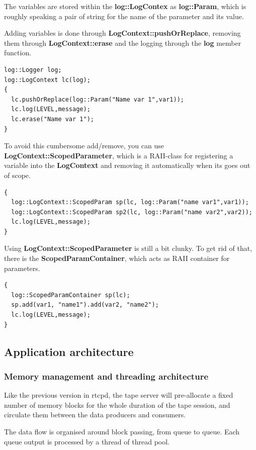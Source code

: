 The variables are stored within the \textbf{log::LogContex} as \textbf{log::Param}, which is roughly speaking a pair of string 
for the name of the parameter and its value.

Adding variables is done through \textbf{LogContext::pushOrReplace}, removing them through \textbf{LogContext::erase} and the 
logging through the \textbf{log} member function.
\begin{table}[h]
\begin{lstlisting}
log::Logger log;
log::LogContext lc(log);
{
  lc.pushOrReplace(log::Param("Name var 1",var1));
  lc.log(LEVEL,message);
  lc.erase("Name var 1");
}
\end{lstlisting}
\end{table}
To avoid this cumbersome add/remove, you can use \textbf{LogContext::ScopedParameter}, which is 
a RAII-class for registering a variable into the \textbf{LogContext} and removing it automatically when its goes out of scope.
\begin{table}[h]
\begin{lstlisting}
{
  log::LogContext::ScopedParam sp(lc, log::Param("name var1",var1));
  log::LogContext::ScopedParam sp2(lc, log::Param("name var2",var2));
  lc.log(LEVEL,message);
}
\end{lstlisting}
\end{table}
Using \textbf{LogContext::ScopedParameter} is still a bit clunky. To get rid of that, there is the 
\textbf{ScopedParamContainer}, which acts as RAII container for parameters.
\begin{table}[h]
\begin{lstlisting}
{
  log::ScopedParamContainer sp(lc);
  sp.add(var1, "name1").add(var2, "name2");
  lc.log(LEVEL,message);
}
\end{lstlisting}
\end{table}
\subsection{Application architecture}
\subsubsection{Memory management and threading architecture}
Like the previous version in rtcpd, the tape server will pre-allocate a fixed number of memory
blocks for the whole duration of the tape session, and circulate them between the data producers 
and consumers.

The data flow is organised around block passing, from queue to queue. Each queue output is processed
by a thread of thread pool.

